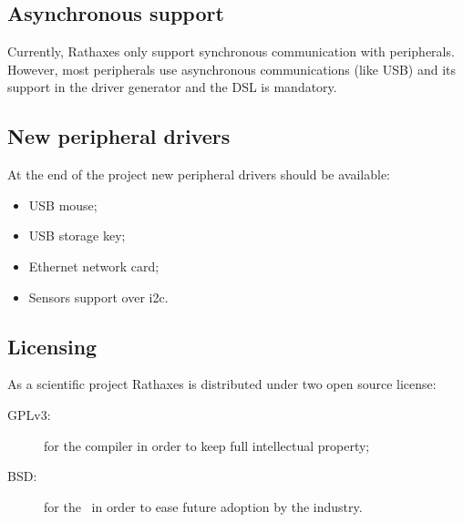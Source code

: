 \subsection{Asynchronous support}

Currently, Rathaxes only support synchronous communication with peripherals.
However, most peripherals use asynchronous communications (like USB) and its
support in the driver generator and the DSL is mandatory.

\subsection{New peripheral drivers}

At the end of the project new peripheral drivers should be available:
\begin{itemize}
\item USB mouse;
\item USB storage key;
\item Ethernet network card;
\item Sensors support over i2c.
\end{itemize}

\subsection{Licensing}

As a scientific project Rathaxes is distributed under two open source license:
\begin{description}
\item[GPLv3:] for the compiler in order to keep full intellectual property;
\item[BSD:] for the \BL\ in order to ease future adoption by the industry.
\end{description}
